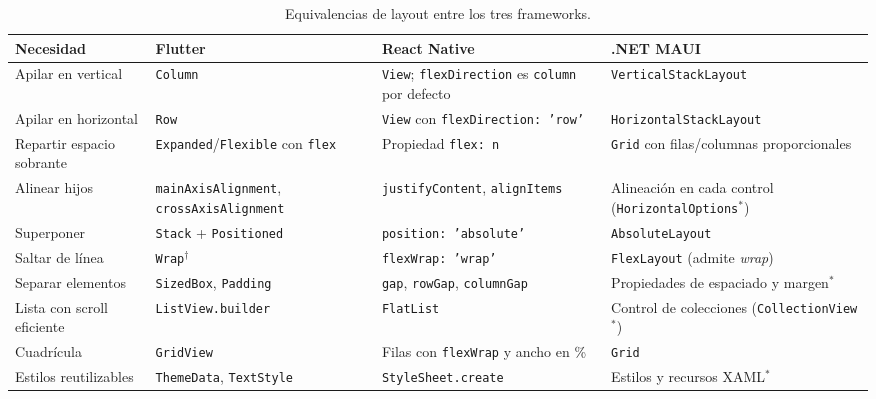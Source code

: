 \begin{table}[H]
	\centering\footnotesize
	\begin{tabularx}{\textwidth}{|p{2.4cm}|X|X|X|}
		\hline
		\rowcolor{tablebackground}\color{white}\textbf{Necesidad} & \color{white}\textbf{Flutter} & \color{white}\textbf{React Native} & \color{white}\textbf{.NET MAUI}\\
		\hline
		Apilar en vertical & \texttt{Column} \cite{flutterlayout} & \texttt{View}; \texttt{flexDirection} es \texttt{column} por defecto \cite{rnflex} & \texttt{VerticalStackLayout} \cite{mauilayout} \\\hline
		Apilar en horizontal & \texttt{Row} \cite{flutterlayout} & \texttt{View} con \texttt{flexDirection: 'row'} \cite{rnflex} & \texttt{HorizontalStackLayout} \cite{mauilayout} \\\hline
		Repartir espacio sobrante & \texttt{Expanded}/\texttt{Flexible} con \texttt{flex} \cite{flutterlayout} & Propiedad \texttt{flex: n} \cite{rnflex} & \texttt{Grid} con filas/columnas proporcionales \cite{mauilayout} \\\hline
		Alinear hijos & \texttt{mainAxisAlignment}, \texttt{crossAxisAlignment} \cite{flutterlayout} & \texttt{justifyContent}, \texttt{alignItems} \cite{rnflex} & Alineación en cada control (\texttt{HorizontalOptions}$^\ast$) \\\hline
		Superponer & \texttt{Stack} + \texttt{Positioned} \cite{flutterlayout,flutterrn} & \texttt{position: 'absolute'} \cite{rnflex} & \texttt{AbsoluteLayout} \cite{mauilayout} \\\hline
		Saltar de línea & \texttt{Wrap}$^\dagger$ & \texttt{flexWrap: 'wrap'} \cite{rnflex} & \texttt{FlexLayout} (admite \emph{wrap}) \cite{mauilayout} \\\hline
		Separar elementos & \texttt{SizedBox}, \texttt{Padding} & \texttt{gap}, \texttt{rowGap}, \texttt{columnGap} \cite{rnflex} & Propiedades de espaciado y margen$^\ast$ \\\hline
		Lista con scroll eficiente & \texttt{ListView.builder} \cite{flutterrn} & \texttt{FlatList} \cite{flutterrn} & Control de colecciones (\texttt{CollectionView}$^\ast$) \cite{mauiwhat} \\\hline
		Cuadrícula & \texttt{GridView} \cite{flutterlayout} & Filas con \texttt{flexWrap} y ancho en \% \cite{rnflex} & \texttt{Grid} \cite{mauilayout} \\\hline
		Estilos reutilizables & \texttt{ThemeData}, \texttt{TextStyle} \cite{flutterrn} & \texttt{StyleSheet.create} \cite{flutterrn} & Estilos y recursos XAML$^\ast$ \\\hline
	\end{tabularx}
	\caption{Equivalencias de layout entre los tres frameworks.}
	\label{tab:equiv}
\end{table}

